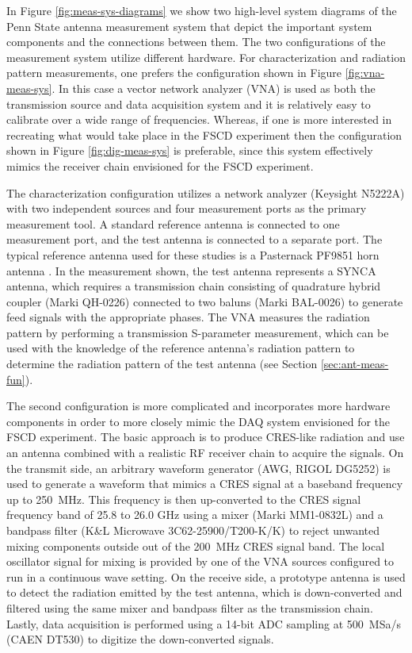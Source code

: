 In Figure \ref{fig:meas-sys-diagrams} we show two high-level system diagrams of the Penn State antenna measurement system that depict the important system components and the connections between them. The two configurations of the measurement system utilize different hardware. For characterization and radiation pattern measurements, one prefers the configuration shown in Figure \ref{fig:vna-meas-sys}. In this case a vector network analyzer (VNA) is used as both the transmission source and data acquisition system and it is relatively easy to calibrate over a wide range of frequencies. Whereas, if one is more interested in recreating what would take place in the FSCD experiment then the configuration shown in Figure \ref{fig:dig-meas-sys} is preferable, since this system effectively mimics the receiver chain envisioned for the FSCD experiment. 

The characterization configuration utilizes a network analyzer (Keysight N5222A) with two independent sources and four measurement ports as the primary measurement tool. A standard reference antenna is connected to one measurement port, and the test antenna is connected to a separate port. The typical reference antenna used for these studies is a Pasternack PF9851 horn antenna . In the measurement shown, the test antenna represents a SYNCA antenna, which requires a transmission chain consisting of quadrature hybrid coupler (Marki QH-0226) connected to two baluns (Marki BAL-0026) to generate feed signals with the appropriate phases. The VNA measures the radiation pattern by performing a transmission S-parameter measurement, which can be used with the knowledge of the reference antenna's radiation pattern to determine the radiation pattern of the test antenna (see Section \ref{sec:ant-meas-fun}).

The second configuration is more complicated and incorporates more hardware components in order to more closely mimic the DAQ system envisioned for the FSCD experiment. The basic approach is to produce CRES-like radiation and use an antenna combined with a realistic RF receiver chain to acquire the signals. On the transmit side, an arbitrary waveform generator (AWG, RIGOL DG5252) is used to generate a waveform that mimics a CRES signal at a baseband frequency up to 250~MHz. This frequency is then up-converted to the CRES signal frequency band of 25.8 to 26.0 GHz using a mixer (Marki MM1-0832L) and a bandpass filter (K\&L Microwave 3C62-25900/T200-K/K) to reject unwanted mixing components outside out of the 200~MHz CRES signal band. The local oscillator signal for mixing is provided by one of the VNA sources configured to run in a continuous wave setting. On the receive side, a prototype antenna is used to detect the radiation emitted by the test antenna, which is down-converted and filtered using the same mixer and bandpass filter as the transmission chain. Lastly, data acquisition is performed using a 14-bit ADC sampling at 500~MSa/s (CAEN DT530) to digitize the down-converted signals.

